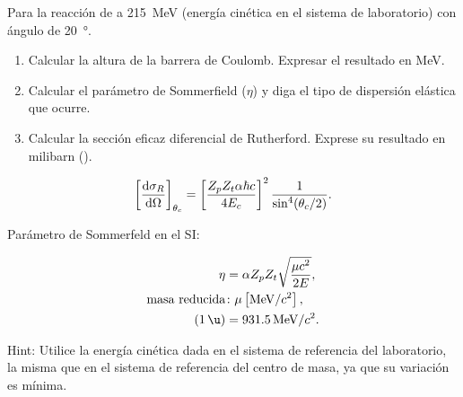 \documentclass[./../main.tex]{subfiles}
\begin{document}
    \begin{exercise}
        Para la reacción de  a \SI{215}{\MeV} (energía cinética en el sistema de laboratorio) con  ángulo de \SI{20}{\degree}.

        \begin{enumerate}[label = \alph*)]
            \item Calcular la altura de la barrera de Coulomb. Expresar el resultado en \si{\MeV}.
            \item Calcular el parámetro de Sommerfield (\(\eta\)) y diga el tipo de dispersión elástica que ocurre.
            \item Calcular la sección eficaz diferencial de Rutherford. Exprese su resultado en milibarn (\si{\mb}).
        \end{enumerate}

        \begin{equation}
            \left[\odv{\sigma_{R}}{\Omega}\right]_{\theta_{c}} = \left[\dfrac{Z_{p}Z_{t}\alpha\hbar c}{4E_{c}}\right]^{2} \dfrac{1}{\sin^{4}(\theta_{c} / 2)}.
        \end{equation}

        \begin{center}
            Parámetro de Sommerfeld en el SI:
        \end{center}

        \begin{align*}
            \eta &= \alpha Z_{p}Z_{t} \sqrt{\dfrac{\mu c^{2}}{2E}},\\
            \text{masa reducida} &\colon \mu \left[\si{\MeV}/c^{2}\right],\nonumber\\
            (\SI{1}{\u}) &= \SI{931.5}{\MeV} / c^{2}.
        \end{align*}

        Hint: Utilice la energía cinética dada en el sistema de referencia del laboratorio, la misma que en el sistema de referencia del centro de masa, ya que su variación es mínima.
    \end{exercise}
\end{document}
